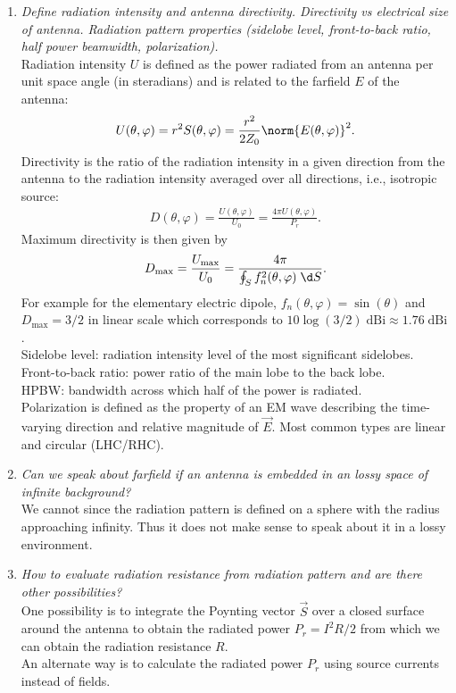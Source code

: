 \documentclass[11pt,a4paper]{article}
\begin{document}
\begin{enumerate}
    \item \emph{Define radiation intensity and antenna directivity. Directivity vs electrical size of antenna. Radiation pattern properties (sidelobe level, front-to-back ratio, half power beamwidth, polarization).}\\
    Radiation intensity $U$ is defined as the power radiated from an antenna per unit space angle (in steradians) and is related to the farfield $E$ of the antenna:
    \begin{align*}
        U(\theta,\varphi) = r^2S(\theta,\varphi) = \frac{r^2}{2Z_0} \norm{E(\theta,\varphi)}^2.
    \end{align*}
    Directivity is the ratio of the radiation intensity in a given direction from the antenna to the radiation intensity averaged over all directions, i.e., isotropic source:
    \begin{align*}
        D(\theta,\varphi) = \frac{U(\theta,\varphi)}{U_0} = \frac{4\pi U(\theta,\varphi)}{P_r}.
    \end{align*}
    Maximum directivity is then given by
    \begin{align*}
        D_{\mathrm{max}} = \frac{U_{\mathrm{max}}}{U_0} = \frac{4\pi}{\oint_S f_n^2(\theta,\varphi) \; \d S}.
    \end{align*}
    For example for the elementary electric dipole, $f_n(\theta,\varphi) = \sin(\theta)$ and $D_{\mathrm{max}} = 3/2$ in linear scale which corresponds to $10\log(3/2) \; \mathrm{dBi} \approx 1.76 \; \mathrm{dBi}$.\\
    Sidelobe level: radiation intensity level of the most significant sidelobes.\\
    Front-to-back ratio: power ratio of the main lobe to the back lobe.\\
    HPBW: bandwidth across which half of the power is radiated.\\
    Polarization is defined as the property of an EM wave describing the time-varying direction and relative magnitude of $\vec E$. Most common types are linear and circular (LHC/RHC).

    \item \emph{Can we speak about farfield if an antenna is embedded in an lossy space of infinite background?}\\
    We cannot since the radiation pattern is defined on a sphere with the radius approaching infinity. Thus it does not make sense to speak about it in a lossy environment.

    \item \emph{How to evaluate radiation resistance from radiation pattern and are there other possibilities?}\\
    One possibility is to integrate the Poynting vector $\vec S$ over a closed surface around the antenna to obtain the radiated power $P_r = I^2 R/2$ from which we can obtain the radiation resistance $R$.\\
    An alternate way is to calculate the radiated power $P_r$ using source currents instead of fields.


\end{enumerate}
\end{document}
